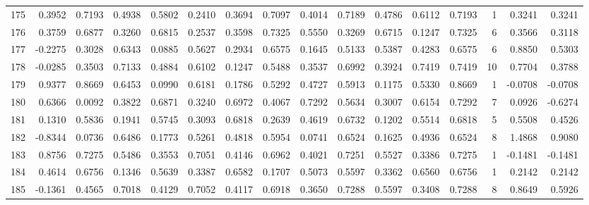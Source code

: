 \begin{tabular}{lrrrrrrrrrrrrrrr}
175 &      0.3952 &  0.7193 &  0.4938 &  0.5802 &  0.2410 &  0.3694 &  0.7097 &  0.4014 &  0.7189 &  0.4786 &   0.6112 &     0.7193 &      1 &                    0.3241 &                     0.3241 \\
176 &      0.3759 &  0.6877 &  0.3260 &  0.6815 &  0.2537 &  0.3598 &  0.7325 &  0.5550 &  0.3269 &  0.6715 &   0.1247 &     0.7325 &      6 &                    0.3566 &                     0.3118 \\
177 &     -0.2275 &  0.3028 &  0.6343 &  0.0885 &  0.5627 &  0.2934 &  0.6575 &  0.1645 &  0.5133 &  0.5387 &   0.4283 &     0.6575 &      6 &                    0.8850 &                     0.5303 \\
178 &     -0.0285 &  0.3503 &  0.7133 &  0.4884 &  0.6102 &  0.1247 &  0.5488 &  0.3537 &  0.6992 &  0.3924 &   0.7419 &     0.7419 &     10 &                    0.7704 &                     0.3788 \\
179 &      0.9377 &  0.8669 &  0.6453 &  0.0990 &  0.6181 &  0.1786 &  0.5292 &  0.4727 &  0.5913 &  0.1175 &   0.5330 &     0.8669 &      1 &                   -0.0708 &                    -0.0708 \\
180 &      0.6366 &  0.0092 &  0.3822 &  0.6871 &  0.3240 &  0.6972 &  0.4067 &  0.7292 &  0.5634 &  0.3007 &   0.6154 &     0.7292 &      7 &                    0.0926 &                    -0.6274 \\
181 &      0.1310 &  0.5836 &  0.1941 &  0.5745 &  0.3093 &  0.6818 &  0.2639 &  0.4619 &  0.6732 &  0.1202 &   0.5514 &     0.6818 &      5 &                    0.5508 &                     0.4526 \\
182 &     -0.8344 &  0.0736 &  0.6486 &  0.1773 &  0.5261 &  0.4818 &  0.5954 &  0.0741 &  0.6524 &  0.1625 &   0.4936 &     0.6524 &      8 &                    1.4868 &                     0.9080 \\
183 &      0.8756 &  0.7275 &  0.5486 &  0.3553 &  0.7051 &  0.4146 &  0.6962 &  0.4021 &  0.7251 &  0.5527 &   0.3386 &     0.7275 &      1 &                   -0.1481 &                    -0.1481 \\
184 &      0.4614 &  0.6756 &  0.1346 &  0.5639 &  0.3387 &  0.6582 &  0.1707 &  0.5073 &  0.5597 &  0.3362 &   0.6560 &     0.6756 &      1 &                    0.2142 &                     0.2142 \\
185 &     -0.1361 &  0.4565 &  0.7018 &  0.4129 &  0.7052 &  0.4117 &  0.6918 &  0.3650 &  0.7288 &  0.5597 &   0.3408 &     0.7288 &      8 &                    0.8649 &                     0.5926 \\

\end{tabular}
